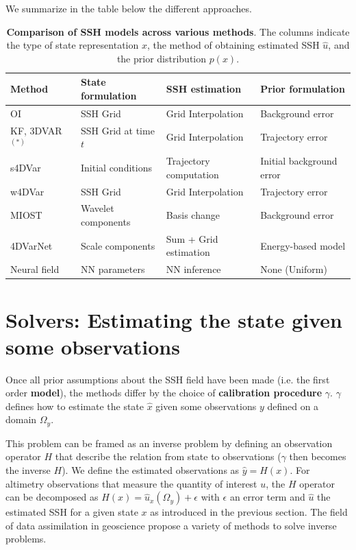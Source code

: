 \begin{bibunit}
We summarize in the table below the different approaches.
  \begin{table}
  \centering
\begin{tabular}{|l|l|l|l|}
\hline
  Method & State formulation & SSH estimation &  Prior formulation\\
\hline
  OI & SSH Grid & Grid Interpolation & Background error \\

  KF, 3DVAR $^{(*)}$ & SSH Grid at time $t$ & Grid Interpolation & Trajectory error \\

  s4DVar & Initial conditions & Trajectory computation & Initial background error \\

  w4DVar & SSH Grid & Grid Interpolation & Trajectory error \\

  MIOST & Wavelet components & Basis change  & Background error \\

  4DVarNet & Scale components & Sum + Grid estimation  & Energy-based model \\

  Neural field & NN parameters & NN inference & None (Uniform) \\
\hline
\end{tabular}
\caption{\textbf{Comparison of SSH models across various methods}. The columns indicate the type of state representation $x$, the method of obtaining estimated SSH $\hat{u}$, and the prior distribution $p(x)$.}
\end{table}



\section{Solvers: Estimating the state given some observations}

Once all prior assumptions about the SSH field have been made (i.e. the first order \textbf{model}), the methods differ by the choice of \textbf{calibration procedure} $\gamma$. $\gamma$ defines how to estimate the state $\hat{x}$ given some observations $y$ defined on a domain $\Omega_y$.

This problem can be framed as an inverse problem by defining an observation operator $H$ that describe the relation from state to observations ($\gamma$ then becomes the inverse $H$).
We define the estimated observations as $\hat{y} = H(x)$. For altimetry observations that measure the quantity of interest $u$, the $H$ operator can be decomposed as $H(x) = \hat{u}_x(\Omega_y) + \epsilon$ with $\epsilon$ an error term and $\hat{u}$ the estimated SSH for a given state $x$ as introduced in the previous section. The field of data assimilation in geoscience propose a variety of methods to solve inverse problems.


\end{bibunit}
